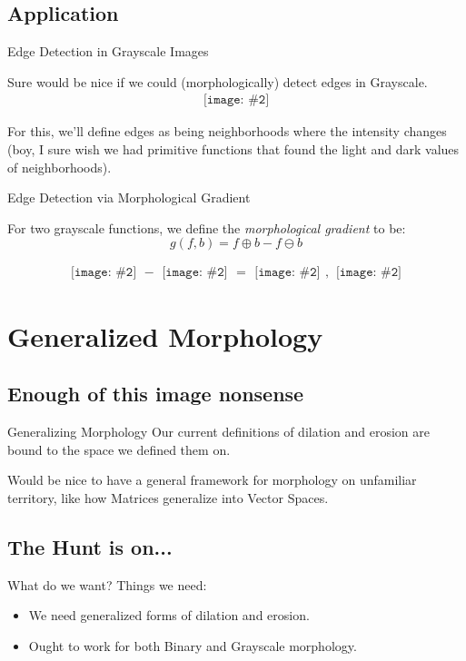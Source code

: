 \documentclass{beamer}
\newcommand{\pic}[2]{
     \begin{array}{l}
      \texttt{[image: \#2]}
      \end{array}
}
\newcommand{\dilate}{\oplus}
\newcommand{\erode}{\ominus}
\begin{document}
\subsection{Application}
\begin{frame}{Edge Detection in Grayscale Images}

  Sure would be nice if we could (morphologically) detect
  edges  in Grayscale.
  $$\pic{width=75pt}{images/grayscalecoolhamblen.png}$$
  
  For this, we'll define edges as being neighborhoods where 
  the intensity changes (boy, I sure wish we had primitive functions
  that found the light and dark values of neighborhoods).
\end{frame}

\begin{frame}{Edge Detection via Morphological Gradient}
  \begin{definition}
    For two grayscale functions, we define the 
    \emph{morphological gradient} to be:
    $$g(f,b) = f \dilate b - f \erode b$$
  \end{definition} 
  $$\pic{width=50pt}{images/coolhamblen_graydilated.png}-
    \pic{width=50pt}{images/coolhamblen_grayeroded.png}=
    \pic{width=50pt}{images/coolhamblen_gradiented.png},
    \pic{width=50pt}{images/coolhamblen_gradiented_inverted.png}$$
\end{frame}


\section{Generalized Morphology}
\subsection{Enough of this image nonsense}
\begin{frame}{Generalizing Morphology}
  Our current definitions of dilation and erosion are bound to
  the space we defined them on.

  Would be nice to have a general framework for morphology on
  unfamiliar territory, like how Matrices generalize into Vector Spaces.
  

\end{frame}

\subsection{The Hunt is on...}
\begin{frame}{What do we want?}
  Things we need:
  \begin{itemize}
    \item We need generalized forms of dilation and erosion.
    \item Ought to work for both Binary and Grayscale morphology.
  \end{itemize} 
\end{frame}
\end{document}
